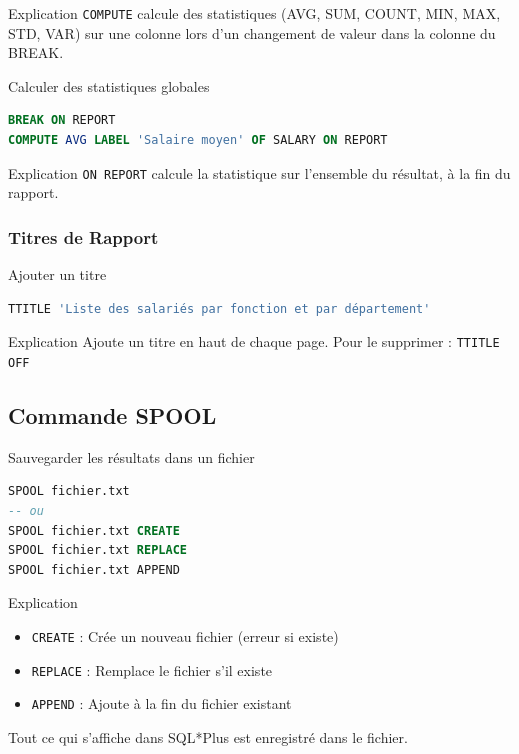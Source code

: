 \documentclass[12pt,a4paper]{article}
\begin{document}
\begin{explication}{Explication}
\texttt{COMPUTE} calcule des statistiques (AVG, SUM, COUNT, MIN, MAX, STD, VAR) sur une colonne lors d'un changement de valeur dans la colonne du BREAK.
\end{explication}

\begin{commande}{Calculer des statistiques globales}
\begin{lstlisting}[language=SQL]
BREAK ON REPORT
COMPUTE AVG LABEL 'Salaire moyen' OF SALARY ON REPORT
\end{lstlisting}
\end{commande}

\begin{explication}{Explication}
\texttt{ON REPORT} calcule la statistique sur l'ensemble du résultat, à la fin du rapport.
\end{explication}

\subsubsection{Titres de Rapport}

\begin{commande}{Ajouter un titre}
\begin{lstlisting}[language=SQL]
TTITLE 'Liste des salariés par fonction et par département'
\end{lstlisting}
\end{commande}

\begin{explication}{Explication}
Ajoute un titre en haut de chaque page. Pour le supprimer : \texttt{TTITLE OFF}
\end{explication}

\subsection{Commande SPOOL}

\begin{commande}{Sauvegarder les résultats dans un fichier}
\begin{lstlisting}[language=SQL]
SPOOL fichier.txt
-- ou
SPOOL fichier.txt CREATE
SPOOL fichier.txt REPLACE
SPOOL fichier.txt APPEND
\end{lstlisting}
\end{commande}

\begin{explication}{Explication}
\begin{itemize}
    \item \texttt{CREATE} : Crée un nouveau fichier (erreur si existe)
    \item \texttt{REPLACE} : Remplace le fichier s'il existe
    \item \texttt{APPEND} : Ajoute à la fin du fichier existant
\end{itemize}
Tout ce qui s'affiche dans SQL*Plus est enregistré dans le fichier.
\end{explication}
\end{document}

